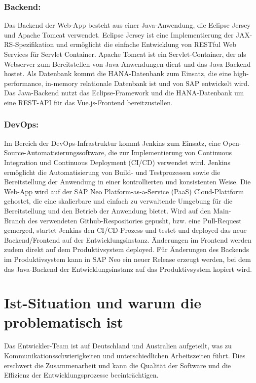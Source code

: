 \subsubsection*{Backend:}

Das Backend der Web-App besteht aus einer Java-Anwendung, die Eclipse Jersey und Apache Tomcat verwendet. 
Eclipse Jersey ist eine Implementierung der JAX-RS-Spezifikation 
und ermöglicht die einfache Entwicklung von RESTful Web Services für Servlet Container. 
Apache Tomcat ist ein Servlet-Container, der als Webserver zum Bereitstellen von Java-Anwendungen dient
und das Java-Backend hostet.
Als Datenbank kommt die HANA-Datenbank zum Einsatz, die eine high-performance, in-memory relationale Datenbank ist 
und von SAP entwickelt wird. 
Das Java-Backend nutzt das Eclipse-Framework und die HANA-Datenbank um eine REST-API für das 
Vue.js-Frontend bereitzustellen. 

\subsubsection*{DevOps:}

Im Bereich der DevOps-Infrastruktur kommt Jenkins zum Einsatz, 
eine Open-Source-Automatisierungssoftware, 
die zur Implementierung von Continuous Integration und Continuous Deployment (CI/CD) verwendet wird. 
Jenkins ermöglicht die Automatisierung von Build- und Testprozessen sowie die Bereitstellung 
der Anwendung in einer kontrollierten und konsistenten Weise. 
Die Web-App wird auf der SAP Neo Platform-as-a-Service (PaaS) Cloud-Plattform gehostet, 
die eine skalierbare und einfach zu verwaltende Umgebung für die Bereitstellung 
und den Betrieb der Anwendung bietet.
Wird auf den Main-Branch des verwendeten Github-Respositories gepusht, bzw. eine Pull-Request gemerged,
startet Jenkins den CI/CD-Prozess und testet und deployed das neue Backend/Frontend auf der Entwicklungsinstanz. 
Änderungen im Frontend werden zudem direkt auf dem Produktivsystem deployed. 
Für Änderungen des Backends im Produktivsystem kann in SAP Neo ein neuer Release erzeugt werden, 
bei dem das Java-Backend der Entwicklungsinstanz auf das Produktivsystem kopiert wird. 


\section{Ist-Situation und warum die problematisch ist}

Das Entwickler-Team ist auf Deutschland und Australien aufgeteilt, 
was zu Kommunikationsschwierigkeiten und unterschiedlichen Arbeitszeiten führt. 
Dies erschwert die Zusammenarbeit und kann die Qualität der Software und die Effizienz 
der Entwicklungsprozesse beeinträchtigen.

